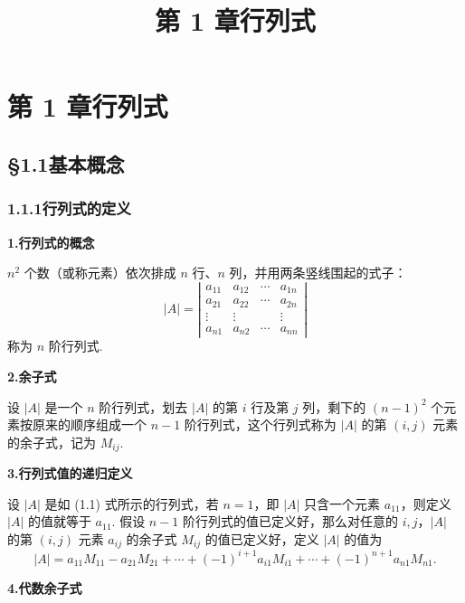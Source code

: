 \documentclass[UTF8, 12pt, fontset=fandol, oneside]{ctexart}
\title{第 1 章\quad 行列式}
\author{}
\date{}
\begin{document}
\maketitle

\section*{第 1 章\quad 行列式}

\subsection*{§1.1\quad 基本概念}

\subsubsection*{1.1.1\quad 行列式的定义}

\noindent\textbf{1.\quad 行列式的概念}

$n^2$ 个数（或称元素）依次排成 $n$ 行、$n$ 列，并用两条竖线围起的式子：
\begin{equation}
|A|=
\left|\begin{array}{cccc}
a_{11} & a_{12} & \cdots & a_{1n}\\
a_{21} & a_{22} & \cdots & a_{2n}\\
\vdots & \vdots &        & \vdots\\
a_{n1} & a_{n2} & \cdots & a_{nn}
\end{array}\right|
\tag{1.1}
\end{equation}
称为 $n$ 阶行列式.

\noindent\textbf{2.\quad 余子式}

设 $|A|$ 是一个 $n$ 阶行列式，划去 $|A|$ 的第 $i$ 行及第 $j$ 列，剩下的 $(n-1)^2$ 个元素按原来的顺序组成一个 $n-1$ 阶行列式，这个行列式称为 $|A|$ 的第 $(i,j)$ 元素的余子式，记为 $M_{ij}$.

\noindent\textbf{3.\quad 行列式值的递归定义}

设 $|A|$ 是如 (1.1) 式所示的行列式，若 $n=1$，即 $|A|$ 只含一个元素 $a_{11}$，则定义 $|A|$ 的值就等于 $a_{11}$. 假设 $n-1$ 阶行列式的值已定义好，那么对任意的 $i,j$，$|A|$ 的第 $(i,j)$ 元素 $a_{ij}$ 的余子式 $M_{ij}$ 的值已定义好，定义 $|A|$ 的值为
\begin{equation}
|A|=a_{11}M_{11}-a_{21}M_{21}+\cdots+(-1)^{i+1}a_{i1}M_{i1}
+\cdots+(-1)^{n+1}a_{n1}M_{n1}.
\tag{1.2}
\end{equation}

\noindent\textbf{4.\quad 代数余子式}
\end{document}

